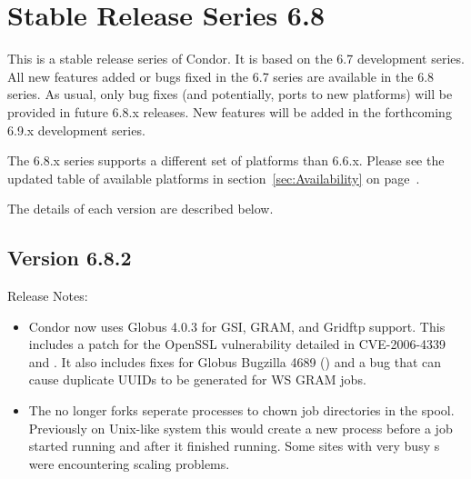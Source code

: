 \section{\label{sec:History-6-8}Stable Release Series 6.8}

This is a stable release series of Condor.
It is based on the 6.7 development series.
All new features added or bugs fixed in the 6.7 series are available
in the 6.8 series.
As usual, only bug fixes (and potentially, ports to new platforms)
will be provided in future 6.8.x releases.
New features will be added in the forthcoming 6.9.x development series.


The 6.8.x series supports a different set of platforms than 6.6.x.
Please see the updated table of available platforms in
section~\ref{sec:Availability} on page~\pageref{sec:Availability}.

The details of each version are described below.


\subsection*{\label{sec:New-6-8-2}Version 6.8.2}

\noindent Release Notes:

\begin{itemize}

\item Condor now uses Globus 4.0.3 for GSI, GRAM, and Gridftp support.
This includes a patch for the OpenSSL vulnerability detailed in 
CVE-2006-4339 and .
It also includes fixes for Globus Bugzilla 4689 
() and a 
bug that can cause duplicate UUIDs to be generated for WS GRAM jobs.

\item The  no longer forks seperate processes to chown job
directories in the spool.  Previously on Unix-like system this would create a
new process before a job started running and after it finished running.   Some
sites with very busy s were encountering scaling problems.

\end{itemize}

